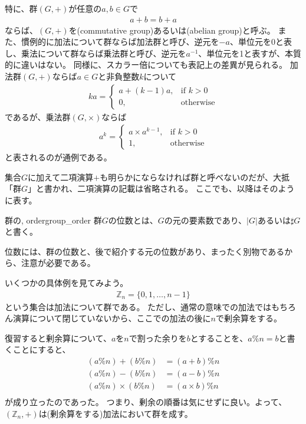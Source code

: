 特に、群$(G,+)$が任意の$a,b{\in}G$で
\begin{eqnarray*}
a + b = b + a
\end{eqnarray*}
ならば、$(G,+)$を(commutative group)あるいは(abelian group)と呼ぶ。
また、慣例的に加法について群ならば加法群と呼び、逆元を$-a$、単位元を0と表し、乗法について群ならば乗法群と呼び、逆元を$a^{-1}$、単位元を1と表すが、本質的に違いはない。
同様に、スカラー倍についても表記上の差異が見られる。
加法群$(G,+)$ならば$a\in{G}$と非負整数$k$について
\begin{eqnarray*}
ka=
\begin{cases}
a + (k-1)a, & \mbox{if } k > 0\\
0, & \mbox{otherwise}
\end{cases}
\end{eqnarray*}
であるが、乗法群$(G,\times)$ならば
\begin{eqnarray*}
a^{k}=
\begin{cases}
a \times a^{k-1}, & \mbox{if } k > 0\\
1, & \mbox{otherwise}
\end{cases}
\end{eqnarray*}
と表されるのが通例である。

集合$G$に加えて二項演算$+$も明らかにならなければ群と呼べないのだが、大抵「群$G$」と書かれ、二項演算の記載は省略される。
ここでも、以降はそのように表す。

\begin{Defi}{群の, order}{group_order}
群$G$の位数とは、$G$の元の要素数であり、$|G|$あるいは$\sharp G$と書く。
\end{Defi}

位数には、群の位数と、後で紹介する元の位数があり、まったく別物であるから、注意が必要である。

いくつかの具体例を見てみよう。
\begin{align*}
\mathbb{Z}_n = \{0,1, \ldots, n-1\}
\end{align*}
という集合は加法について群である。
ただし、通常の意味での加法ではもちろん演算について閉じていないから、ここでの加法の後に$n$で剰余算をする。

復習すると剰余算について、$a$を$n$で割った余りを$b$とすることを、$a \% n =b$と書くことにすると、
\begin{align*}
(a \% n) + (b \% n) &= (a + b) \% n\\
(a \% n) - (b \% n) &= (a - b) \% n\\
(a \% n) \times (b \% n) &= (a \times b) \% n\\
\end{align*}
が成り立ったのであった。
つまり、剰余の順番は気にせずに良い。よって、$(\mathbb{Z}_n,+)$は(剰余算をする)加法において群を成す。


